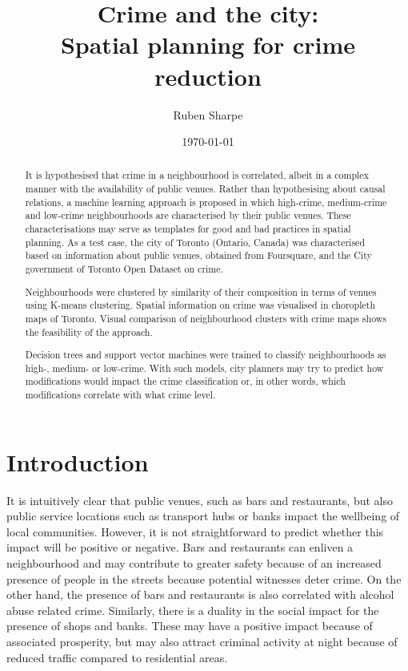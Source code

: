 \documentclass{article}
\author{Ruben Sharpe}
\title{Crime and the city:\\Spatial planning for crime reduction}
\date{\today}
\begin{document}
\maketitle

\begin{abstract}
 It is hypothesised that crime in a neighbourhood is correlated, albeit in a complex manner with the availability of public venues. Rather than hypothesising about causal relations, a machine learning approach is proposed in which high-crime, medium-crime and low-crime neighbourhoods are characterised by their public venues. These characterisations may serve as templates for good and bad practices in spatial planning.
 As a test case, the city of Toronto (Ontario, Canada) was characterised based on information about public venues, obtained from Foursquare, and the City government of Toronto Open Dataset on crime. 
 
 Neighbourhoods were clustered by similarity of their composition in terms of venues using K-means clustering.  
 Spatial information on crime was visualised in choropleth maps of Toronto. Visual comparison of neighbourhood clusters with crime maps shows the feasibility of the approach.
 
 Decision trees and support vector machines were trained to classify neighbourhoods as high-, medium- or low-crime. With such models, city planners may try to predict how modifications would impact the crime classification or, in other words, which modifications correlate with what crime level.
\end{abstract}

\tableofcontents



\section{Introduction}
It is intuitively clear that public venues, such as bars and restaurants, but also public service locations such as transport hubs or banks impact the wellbeing of local communities. However, it is not straightforward to predict whether this impact will be positive or negative. Bars and restaurants can enliven a neighbourhood and may contribute to greater safety because of an increased presence of people in the streets because potential witnesses deter crime. On the other hand, the presence of bars and restaurants is also correlated with alcohol abuse related crime. Similarly, there is a duality in the social impact for the presence of shops and banks. These may have a positive impact because of associated prosperity, but may also attract criminal activity at night because of reduced traffic compared to residential areas.\\
\end{document}
